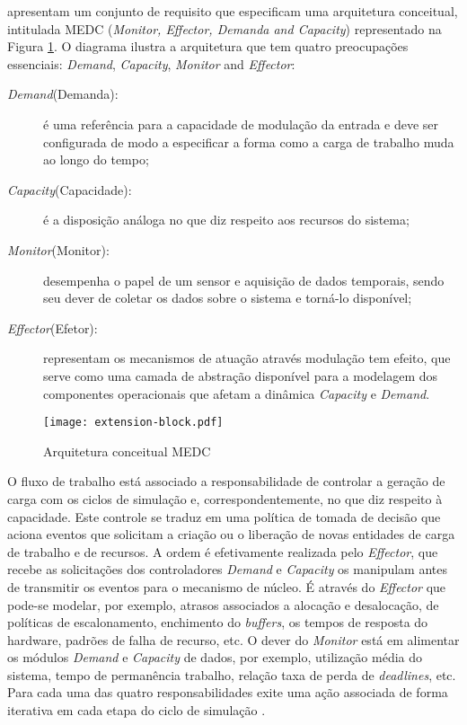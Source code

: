  apresentam um conjunto de requisito que especificam uma arquitetura conceitual, intitulada MEDC (\textit{Monitor, Effector, Demanda and Capacity}) representado na Figura \ref{fig:extension-block}. O diagrama ilustra a arquitetura que tem quatro preocupações essenciais: \textit{Demand}, \textit{Capacity}, \textit{Monitor} and \textit{Effector}:

\begin{description}
	\item[\textit{Demand}(Demanda):] é uma referência para a capacidade de modulação da entrada e deve ser configurada de modo a especificar a forma como a carga de trabalho muda ao longo do tempo;
	\item[\textit{Capacity}(Capacidade):]  é a disposição análoga no que diz respeito aos recursos do sistema;
	\item[\textit{Monitor}(Monitor):] desempenha o papel de um sensor e aquisição de dados temporais, sendo seu dever de coletar os dados sobre o sistema e torná-lo disponível;
	\item[\textit{Effector}(Efetor):] representam os mecanismos de atuação através modulação tem efeito, que serve como uma camada de abstração disponível para a modelagem dos componentes operacionais que afetam a dinâmica \textit{Capacity} e \textit{Demand}.
\end{description}

\begin{figure}[!htb]
	\centering
	\texttt{[image: extension-block.pdf]}
	\caption{Arquitetura conceitual MEDC}
	\label{fig:extension-block}
\end{figure}

O fluxo de trabalho está associado a responsabilidade de controlar a geração de carga com os ciclos de simulação e, correspondentemente, no que diz respeito à capacidade. Este controle se traduz em uma política de tomada de decisão que aciona eventos que solicitam a criação ou o liberação de novas entidades de carga de trabalho e de recursos. A ordem é efetivamente realizada pelo \textit{Effector}, que recebe as solicitações dos controladores \textit{Demand} e \textit{Capacity} os manipulam antes de transmitir os eventos para o mecanismo de núcleo. É através do \textit{Effector} que pode-se modelar, por exemplo, atrasos associados a alocação e desalocação, de políticas de escalonamento, enchimento do \textit{buffers}, os tempos de resposta do hardware, padrões de falha de recurso, etc. O dever do \textit{Monitor} está em alimentar os módulos \textit{Demand} e \textit{Capacity} de dados, por exemplo, utilização média do sistema, tempo de permanência trabalho, relação taxa de perda de \textit{deadlines}, etc. Para cada uma das quatro responsabilidades exite uma ação associada de forma iterativa em cada etapa do ciclo de simulação \cite{Lourenco2015}. 

